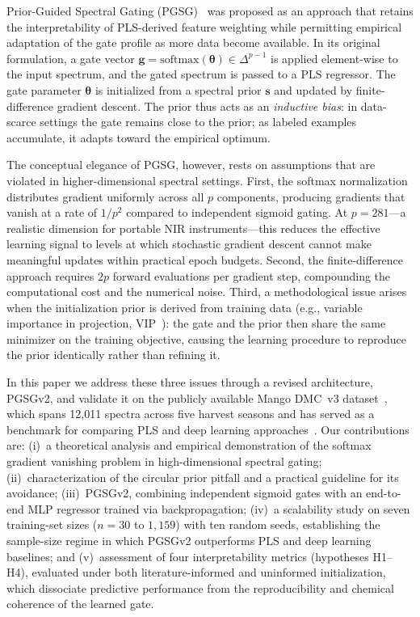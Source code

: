 \documentclass[preprint,12pt,hidelinks]{elsarticle}
\begin{document}
Prior-Guided Spectral Gating (PGSG)~\cite{pgsg_original} was proposed as
an approach that retains the interpretability of PLS-derived feature
weighting while permitting empirical adaptation of the gate profile as more
data become available. In its original formulation, a gate vector
$\mathbf{g} = \mathrm{softmax}(\boldsymbol{\theta}) \in \Delta^{p-1}$ is
applied element-wise to the input spectrum, and the gated spectrum is
passed to a PLS regressor. The gate parameter $\boldsymbol{\theta}$ is
initialized from a spectral prior $\mathbf{s}$ and updated by
finite-difference gradient descent. The prior thus acts as an \emph{inductive
bias}: in data-scarce settings the gate remains close to the prior; as
labeled examples accumulate, it adapts toward the empirical optimum.

The conceptual elegance of PGSG, however, rests on assumptions that are
violated in higher-dimensional spectral settings. First, the softmax
normalization distributes gradient uniformly across all $p$ components,
producing gradients that vanish at a rate of $1/p^2$ compared to
independent sigmoid gating. At $p = 281$---a realistic dimension for
portable NIR instruments---this reduces the effective learning signal to
levels at which stochastic gradient descent cannot make meaningful updates
within practical epoch budgets. Second, the finite-difference approach
requires $2p$ forward evaluations per gradient step, compounding the
computational cost and the numerical noise. Third, a methodological issue
arises when the initialization prior is derived from training data (e.g.,
variable importance in projection, VIP~\cite{chong2005}): the gate and the prior then share
the same minimizer on the training objective, causing the learning procedure
to reproduce the prior identically rather than refining it.

In this paper we address these three issues through a revised architecture,
PGSGv2, and validate it on the publicly available Mango DMC~v3
dataset~\cite{anderson2021}, which spans 12,011 spectra across five harvest
seasons and has served as a benchmark for comparing PLS and deep learning
approaches~\cite{walsh2024,mishra2021synergistic,mishra2021deep}. Our
contributions are: (i)~a theoretical analysis and empirical demonstration
of the softmax gradient vanishing problem in high-dimensional spectral
gating; (ii)~characterization of the circular prior pitfall and a practical
guideline for its avoidance; (iii)~PGSGv2, combining independent sigmoid
gates with an end-to-end MLP regressor trained via backpropagation;
(iv)~a scalability study on seven training-set sizes ($n = 30$ to $1{,}159$)
with ten random seeds, establishing the sample-size regime in which
PGSGv2 outperforms PLS and deep learning baselines; and
(v)~assessment of four interpretability metrics (hypotheses H1--H4),
evaluated under both literature-informed and uninformed initialization,
which dissociate predictive performance from the reproducibility and
chemical coherence of the learned gate.
\end{document}

